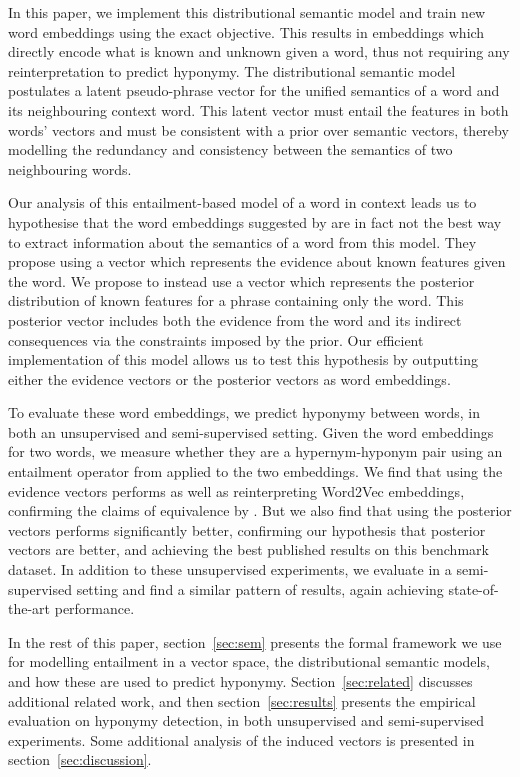 \documentclass[11pt,a4paper]{article}
\begin{document}
In this paper, we implement this distributional semantic model and train new
word embeddings using the exact objective.  This results in embeddings which
directly encode what is known and unknown given a word, thus not requiring any
reinterpretation to predict hyponymy.  The distributional semantic model
postulates a latent pseudo-phrase vector for the unified semantics of a word
and its neighbouring context word.  This latent vector must entail the
features in both words' vectors and must be consistent with a prior over
semantic vectors, thereby modelling the redundancy and consistency between the
semantics of two neighbouring words.

Our analysis of this entailment-based model of a word in context leads us to
hypothesise that the word embeddings suggested by
\linebreak\citet{Henderson16_acl} are in fact not the best way to extract
information about the semantics of a word from this model.  They propose using
a vector which represents the evidence about known features given the word.
We propose to instead use a vector which represents the posterior distribution
of known features for a phrase containing only the word.  This posterior
vector includes both the evidence from the word and its indirect consequences
via the constraints imposed by the prior.  Our efficient implementation of
this model allows us to test this hypothesis by outputting either the evidence
vectors or the posterior vectors as word embeddings.


To evaluate these word embeddings, we predict hyponymy between words, in both
an unsupervised and semi-supervised setting.  Given the word embeddings for
two words, we measure whether they are a hypernym-hyponym pair using an
entailment operator from \citep{Henderson16_acl} applied to the two
embeddings.  We find that using the evidence vectors performs as well as
reinterpreting Word2Vec embeddings, confirming the claims of equivalence by
\citet{Henderson16_acl}.  But we also find that using the posterior vectors
performs significantly better, confirming our hypothesis that posterior
vectors are better, and achieving the best published results on this benchmark
dataset.  In addition to these unsupervised experiments, we evaluate in a
semi-supervised setting and find a similar pattern of results, again achieving
state-of-the-art performance.


In the rest of this paper, section~\ref{sec:sem} presents the formal
framework we use for modelling entailment in a vector space, the
distributional semantic models, and how these are used to predict hyponymy.
Section~\ref{sec:related} discusses additional related work, and then
section~\ref{sec:results} presents the empirical evaluation on hyponymy
detection, in both unsupervised and semi-supervised experiments.  Some
additional analysis of the induced vectors is presented in
section~\ref{sec:discussion}.
\end{document}
